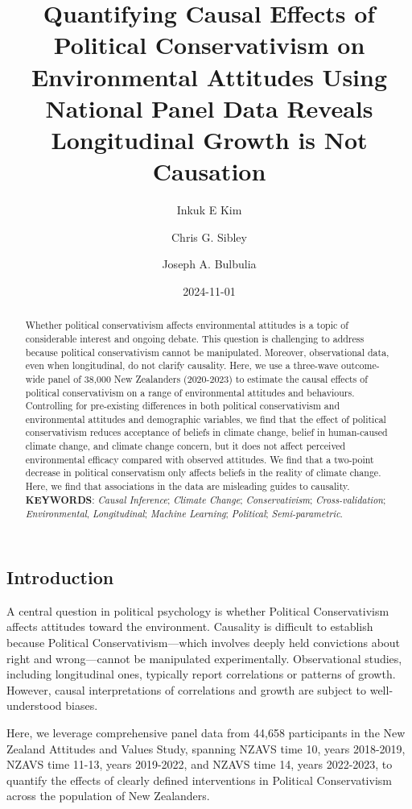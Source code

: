 \documentclass[
  single column]{article}
\title{Quantifying Causal Effects of Political Conservativism on
Environmental Attitudes Using National Panel Data Reveals Longitudinal
Growth is Not Causation}
\author{Inkuk E Kim}
\affil{%
             \small{     Victoria University of Wellington, New Zealand
          ORCID \textcolor[HTML]{A6CE39}{\aiOrcid} ~0000-0003-3169-6576 }
              }
\author{Chris G. Sibley}
\affil{%
             \small{     School of Psychology, University of Auckland
          ORCID \textcolor[HTML]{A6CE39}{\aiOrcid} ~0000-0002-4064-8800 }
              }
\author{Joseph A. Bulbulia}
\affil{%
             \small{     Victoria University of Wellington, New Zealand
          ORCID \textcolor[HTML]{A6CE39}{\aiOrcid} ~0000-0002-5861-2056 }
              }
\date{2024-11-01}
\begin{document}
\maketitle
\begin{abstract}
Whether political conservativism affects environmental attitudes is a
topic of considerable interest and ongoing debate. This question is
challenging to address because political conservativism cannot be
manipulated. Moreover, observational data, even when longitudinal, do
not clarify causality. Here, we use a three-wave outcome-wide panel of
38,000 New Zealanders (2020-2023) to estimate the causal effects of
political conservativism on a range of environmental attitudes and
behaviours. Controlling for pre-existing differences in both political
conservativism and environmental attitudes and demographic variables, we
find that the effect of political conservativism reduces acceptance of
beliefs in climate change, belief in human-caused climate change, and
climate change concern, but it does not affect perceived environmental
efficacy compared with observed attitudes. We find that a two-point
decrease in political conservatism only affects beliefs in the reality
of climate change. Here, we find that associations in the data are
misleading guides to causality. \textbf{KEYWORDS}: \emph{Causal
Inference}; \emph{Climate Change}; \emph{Conservativism};
\emph{Cross-validation}; \emph{Environmental}, \emph{Longitudinal};
\emph{Machine Learning}; \emph{Political}; \emph{Semi-parametric}.
\end{abstract}


\subsection{Introduction}\label{introduction}

A central question in political psychology is whether Political
Conservativism affects attitudes toward the environment. Causality is
difficult to establish because Political Conservativism---which involves
deeply held convictions about right and wrong---cannot be manipulated
experimentally. Observational studies, including longitudinal ones,
typically report correlations or patterns of growth. However, causal
interpretations of correlations and growth are subject to
well-understood biases.

Here, we leverage comprehensive panel data from 44,658 participants in
the New Zealand Attitudes and Values Study, spanning NZAVS time 10,
years 2018-2019, NZAVS time 11-13, years 2019-2022, and NZAVS time 14,
years 2022-2023, to quantify the effects of clearly defined
interventions in Political Conservativism across the population of New
Zealanders.
\end{document}
